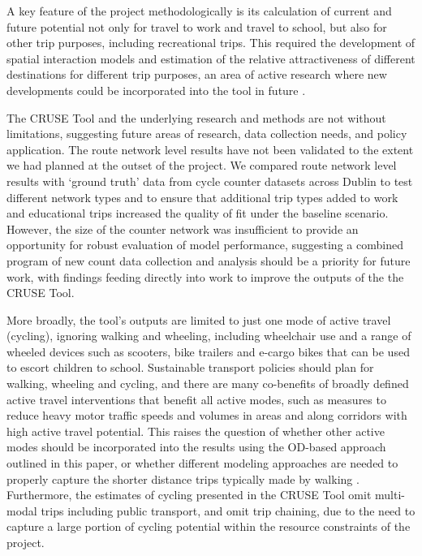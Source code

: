 \documentclass[
  super,
  preprint,
  3p]{elsarticle}
\begin{document}
A key feature of the project methodologically is its calculation of
current and future potential not only for travel to work and travel to
school, but also for other trip purposes, including recreational trips.
This required the development of spatial interaction models and
estimation of the relative attractiveness of different destinations for
different trip purposes, an area of active research where new
developments could be incorporated into the tool in future
\citep{hasova2022}.

The CRUSE Tool and the underlying research and methods are not without
limitations, suggesting future areas of research, data collection needs,
and policy application. The route network level results have not been
validated to the extent we had planned at the outset of the project. We
compared route network level results with `ground truth' data from cycle
counter datasets across Dublin to test different network types and to
ensure that additional trip types added to work and educational trips
increased the quality of fit under the baseline scenario. However, the
size of the counter network was insufficient to provide an opportunity
for robust evaluation of model performance, suggesting a combined
program of new count data collection and analysis should be a priority
for future work, with findings feeding directly into work to improve the
outputs of the the CRUSE Tool.

More broadly, the tool's outputs are limited to just one mode of active
travel (cycling), ignoring walking and wheeling, including wheelchair
use and a range of wheeled devices such as scooters, bike trailers and
e-cargo bikes that can be used to escort children to school. Sustainable
transport policies should plan for walking, wheeling and cycling, and
there are many co-benefits of broadly defined active travel
interventions that benefit all active modes, such as measures to reduce
heavy motor traffic speeds and volumes in areas and along corridors with
high active travel potential. This raises the question of whether other
active modes should be incorporated into the results using the OD-based
approach outlined in this paper, or whether different modeling
approaches are needed to properly capture the shorter distance trips
typically made by walking \citep{cooper2018}. Furthermore, the estimates
of cycling presented in the CRUSE Tool omit multi-modal trips including
public transport, and omit trip chaining, due to the need to capture a
large portion of cycling potential within the resource constraints of
the project.
\end{document}
